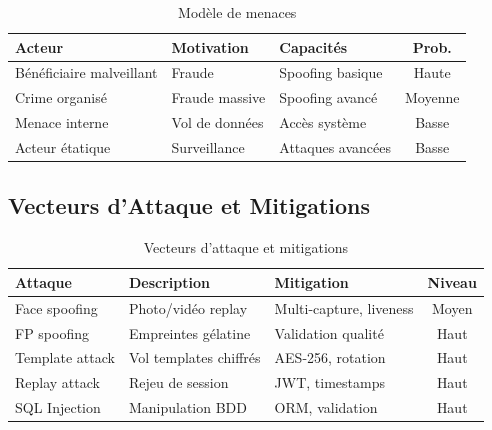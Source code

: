 \documentclass[12pt,a4paper]{report}
\begin{document}
\begin{table}[H]
    \centering
    \caption{Modèle de menaces}
    \label{tab:threats}
    \begin{tabular}{|l|l|l|c|}
        \hline
        \textbf{Acteur} & \textbf{Motivation} & \textbf{Capacités} & \textbf{Prob.} \\
        \hline
        Bénéficiaire malveillant & Fraude & Spoofing basique & Haute \\
        \hline
        Crime organisé & Fraude massive & Spoofing avancé & Moyenne \\
        \hline
        Menace interne & Vol de données & Accès système & Basse \\
        \hline
        Acteur étatique & Surveillance & Attaques avancées & Basse \\
        \hline
    \end{tabular}
\end{table}

\subsection{Vecteurs d'Attaque et Mitigations}

\begin{table}[H]
    \centering
    \caption{Vecteurs d'attaque et mitigations}
    \label{tab:attacks}
    \begin{tabular}{|l|p{3.5cm}|p{3.5cm}|c|}
        \hline
        \textbf{Attaque} & \textbf{Description} & \textbf{Mitigation} & \textbf{Niveau} \\
        \hline
        Face spoofing & Photo/vidéo replay & Multi-capture, liveness & Moyen \\
        \hline
        FP spoofing & Empreintes gélatine & Validation qualité & Haut \\
        \hline
        Template attack & Vol templates chiffrés & AES-256, rotation & Haut \\
        \hline
        Replay attack & Rejeu de session & JWT, timestamps & Haut \\
        \hline
        SQL Injection & Manipulation BDD & ORM, validation & Haut \\
        \hline
    \end{tabular}
\end{table}

\end{document}
